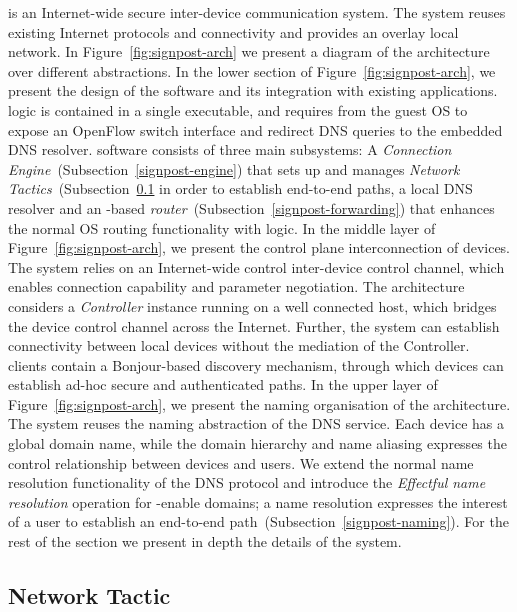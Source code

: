 \signpost is an Internet-wide secure inter-device communication system. The
system reuses existing Internet protocols and connectivity and provides
an overlay local network. In Figure~\ref{fig:signpost-arch} we present 
a diagram of the \signpost architecture over different abstractions. 
In the lower section of Figure~\ref{fig:signpost-arch}, we present the design of
the \signpost software and its integration with existing applications.
\signpost logic is contained in a single executable, and requires from the guest
OS to expose an OpenFlow switch interface and redirect DNS queries to the
embedded DNS resolver.  \signpost software consists of three main subsystems: A
{\it Connection Engine}~(Subsection~\ref{signpost-engine}) that sets up and
manages {\it Network Tactics}~(Subsection~\ref{signpost-tactic} in order to establish
end-to-end paths, a local DNS resolver and an \of-based {\it \signpost
  router}~(Subsection~\ref{signpost-forwarding}) that enhances the normal OS
routing functionality with \signpost logic.  
In the middle layer of Figure~\ref{fig:signpost-arch}, we present the control
plane interconnection of \signpost devices. The system relies on an
Internet-wide control inter-device control channel, which enables
connection capability and parameter negotiation. The architecture considers a
\emph{Controller \signpost} instance running on a well connected host, which bridges
the device control channel across the Internet.  Further, the system can
establish connectivity between local devices without the mediation of the
\signpost Controller.  \signpost clients contain a Bonjour-based discovery
mechanism, through which devices can establish ad-hoc secure and authenticated
paths.
In the upper layer of Figure~\ref{fig:signpost-arch}, we present the naming
organisation of the \signpost architecture. The system reuses the naming
abstraction of the DNS service. Each device has a global domain name, while the
domain hierarchy and name aliasing expresses the control relationship between
devices and users.  We extend the normal name resolution functionality of the
DNS protocol and introduce the  {\it Effectful name resolution} operation for
\signpost-enable domains; a name resolution expresses the interest of a user to
establish an end-to-end path~(Subsection~\ref{signpost-naming}). For the rest of
the section we present in depth the details of the \signpost system. 

\subsection{Network Tactic} \label{signpost-tactic}


